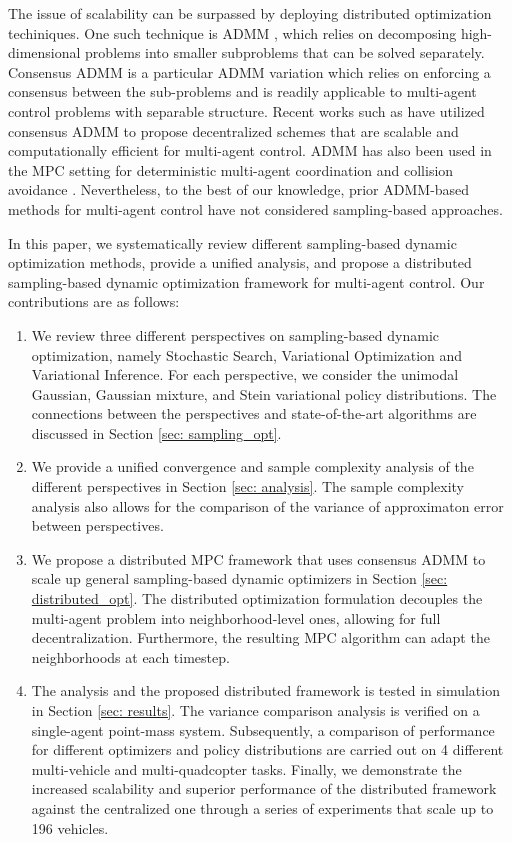 \documentclass[twoside,11pt]{article}
\begin{document}
The issue of scalability can be surpassed by deploying distributed optimization techiniques. One such technique is \ac{ADMM} \citep{boyd2011distributed}, which relies on decomposing high-dimensional problems into smaller subproblems that can be solved separately. Consensus \ac{ADMM} is a particular ADMM variation which relies on enforcing a consensus between the sub-problems and is readily applicable to multi-agent control problems with separable structure. Recent works such as \citep{saravanos2021distributed, halsted2021survey, tang2021fast, pereira2022decentralized, saravanos2022distributed} have utilized consensus \ac{ADMM} to propose decentralized schemes that are scalable and computationally efficient for multi-agent control. ADMM has also been used in the \ac{MPC} setting for deterministic multi-agent coordination and collision avoidance \citep{lu2014separable, rey2018fully, cheng2021admm}. Nevertheless, to the best of our knowledge, prior \ac{ADMM}-based methods for multi-agent control have not considered sampling-based approaches. 

In this paper, we systematically review different sampling-based dynamic optimization methods, provide a unified analysis, and propose a distributed sampling-based dynamic optimization framework for multi-agent control. Our contributions are as follows:

\begin{enumerate}
\item We review three different perspectives on sampling-based dynamic optimization, namely Stochastic Search, Variational Optimization and Variational Inference. For each perspective, we consider the unimodal Gaussian, Gaussian mixture, and Stein variational policy distributions.
The connections between the perspectives and state-of-the-art algorithms are discussed in Section \ref{sec: sampling_opt}. 
\item We provide a unified convergence and sample complexity analysis of the different perspectives in Section \ref{sec: analysis}. The sample complexity analysis also allows for the comparison of the variance of approximaton error between perspectives.
\item We propose a distributed \ac{MPC} framework that uses consensus \ac{ADMM} to scale up general sampling-based dynamic optimizers in Section \ref{sec: distributed_opt}. The distributed optimization formulation decouples the multi-agent problem into neighborhood-level ones, allowing for full decentralization. Furthermore, the resulting \ac{MPC} algorithm can adapt the neighborhoods at each timestep.
\item The analysis and the proposed distributed framework is tested in simulation in Section \ref{sec: results}. The variance comparison analysis is verified on a single-agent point-mass system. Subsequently, a comparison of performance for different optimizers and policy distributions are carried out on 4 different multi-vehicle and multi-quadcopter tasks. Finally, we demonstrate the increased scalability and superior performance of the distributed framework against the centralized one through a series of experiments that scale up to 196 vehicles. 
\end{enumerate}
\end{document}
